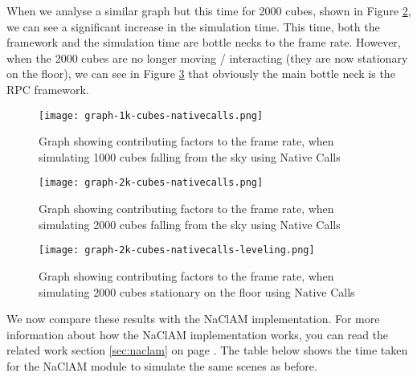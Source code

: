 When we analyse a similar graph but this time for 2000 cubes, shown in Figure \ref{fig:graph-2k-cubes-nativecalls}, we can see a significant increase in the simulation time. This time, both the framework and the simulation time are bottle necks to the frame rate. However, when the 2000 cubes are no longer moving / interacting (they are now stationary on the floor), we can see in Figure \ref{fig:graph-2k-cubes-nativecalls-leveling} that obviously the main bottle neck is the RPC framework.

\begin{figure}
    \centering
    \texttt{[image: graph-1k-cubes-nativecalls.png]} 
    \caption{Graph showing contributing factors to the frame rate, when simulating 1000 cubes falling from the sky using Native Calls}
    \label{fig:graph-1k-cubes-nativecalls}
\end{figure}

\begin{figure}
    \centering
    \texttt{[image: graph-2k-cubes-nativecalls.png]} 
    \caption{Graph showing contributing factors to the frame rate, when simulating 2000 cubes falling from the sky using Native Calls}
    \label{fig:graph-2k-cubes-nativecalls}
\end{figure}

\begin{figure}
    \centering
    \texttt{[image: graph-2k-cubes-nativecalls-leveling.png]} 
    \caption{Graph showing contributing factors to the frame rate, when simulating 2000 cubes stationary on the floor using Native Calls}
    \label{fig:graph-2k-cubes-nativecalls-leveling}
\end{figure}


We now compare these results with the NaClAM implementation. For more information about how the NaClAM implementation works, you can read the related work section \ref{sec:naclam} on page \pageref{sec:naclam}. The table below shows the time taken for the NaClAM module to simulate the same scenes as before.

